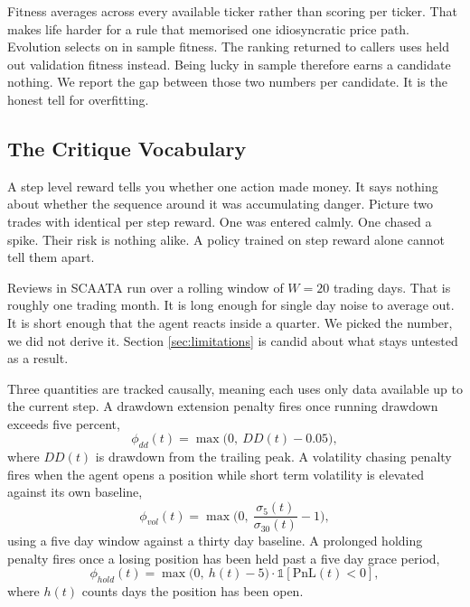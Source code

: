 \documentclass[conference]{IEEEtran}
\begin{document}
Fitness averages across every available ticker rather than scoring per ticker. That makes life harder for a rule that memorised one idiosyncratic price path. Evolution selects on in sample fitness. The ranking returned to callers uses held out validation fitness instead. Being lucky in sample therefore earns a candidate nothing. We report the gap between those two numbers per candidate. It is the honest tell for overfitting.

\subsection{The Critique Vocabulary}
\label{sec:vocab}

A step level reward tells you whether one action made money. It says nothing about whether the sequence around it was accumulating danger. Picture two trades with identical per step reward. One was entered calmly. One chased a spike. Their risk is nothing alike. A policy trained on step reward alone cannot tell them apart.

Reviews in SCAATA run over a rolling window of $W = 20$ trading days. That is roughly one trading month. It is long enough for single day noise to average out. It is short enough that the agent reacts inside a quarter. We picked the number, we did not derive it. Section \ref{sec:limitations} is candid about what stays untested as a result.

Three quantities are tracked causally, meaning each uses only data available up to the current step. A drawdown extension penalty fires once running drawdown exceeds five percent,
\begin{equation}
\phi_{dd}(t) = \max\!\big(0,\ DD(t) - 0.05\big),
\label{eq:phidd}
\end{equation}
where $DD(t)$ is drawdown from the trailing peak. A volatility chasing penalty fires when the agent opens a position while short term volatility is elevated against its own baseline,
\begin{equation}
\phi_{vol}(t) = \max\!\Big(0,\ \frac{\sigma_{5}(t)}{\sigma_{30}(t)} - 1\Big),
\label{eq:phivol}
\end{equation}
using a five day window against a thirty day baseline. A prolonged holding penalty fires once a losing position has been held past a five day grace period,
\begin{equation}
\phi_{hold}(t) = \max\!\big(0,\ h(t) - 5\big) \cdot \mathbb{1}[\text{PnL}(t) < 0],
\label{eq:phihold}
\end{equation}
where $h(t)$ counts days the position has been open.
\end{document}
